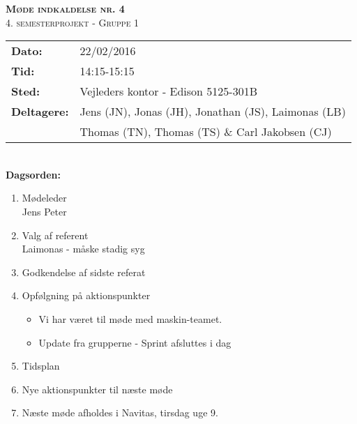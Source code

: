 
\newcommand{\HRule}{\rule{\linewidth}{0.1mm}}


	\begin{center}
		{\huge \bfseries \textsc{Møde indkaldelse nr. 4}}\\
		\textsc{\large 4. semesterprojekt - Gruppe 1}\\[0.3cm]
	\end{center}
	\begin{tabular}{ll}
	\large \textbf{Dato:} & 22/02/2016  \\ %
	\large \textbf{Tid:}  & 14:15-15:15 \\ %
	\large \textbf{Sted:} & Vejleders kontor - Edison 5125-301B		\\ %
	\large \textbf{Deltagere:} & Jens (JN), Jonas (JH), Jonathan (JS), Laimonas (LB) \\
	\large \textbf & Thomas (TN),  Thomas (TS) \& Carl Jakobsen (CJ)\\
	\end{tabular}\\
	\phantom{\,}\hspace{0.1em} \large \textbf{Dagsorden:}
	\begin{enumerate}
		\itemsep 0.3em 
		\item Mødeleder\\
			Jens Peter\\
		\item Valg af referent\\
			Laimonas - måske stadig syg\\
		\item Godkendelse af sidste referat\\
		\item Opfølgning på aktionspunkter
		\begin{itemize}
			\itemsep 0.3em 
			\item Vi har været til møde med maskin-teamet.
			\item Update fra grupperne - Sprint afsluttes i dag\\
		\end{itemize}
		\item Tidsplan\\
		\item Nye aktionspunkter til næste møde\\
		\item Næste møde afholdes i Navitas, tirsdag uge 9.
	\end{enumerate}
